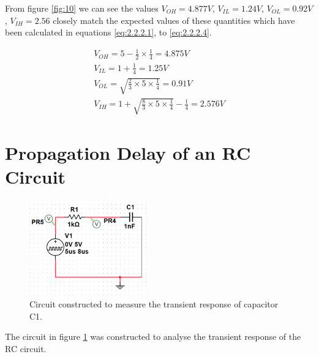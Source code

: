 \documentclass[11pt, a4paper]{article}
\begin{document}
From figure \ref{fig:10} we can see the values $V_{OH} = 4.877V$, $V_{IL} = 1.24V$, $V_{OL} = 0.92V$, 
$V_{IH} = 2.56$ closely match the expected values of these quantities which have been calculated in equations \ref{eq:2.2.2.1}, to \ref{eq:2.2.2.4}.

\begin{gather}
  V_{OH} = 5 - \frac{1}{2} \times \frac{1}{4} = 4.875V\label{eq:2.2.2.1}\\
  V_{IL} = 1 + \frac{1}{4} = 1.25V\label{eq:2.2.2.2}\\
  V_{OL} = \sqrt{\frac{2}{3} \times 5 \times \frac{1}{4}} = 0.91V \label{eq:2.2.2.3}\\
  V_{IH} = 1 + \sqrt{\frac{8}{3} \times 5 \times \frac{1}{4}} - \frac{1}{4} = 2.576V\label{eq:2.2.2.4}
\end{gather}



\newpage
\section{Propagation Delay of an RC Circuit}
\FloatBarrier


\begin{figure}[h]
    \centering
    \includegraphics[width=0.45\textwidth, trim={0 0cm  0 0},clip]{report/img/question_4/circuit4.png}
    \captionsetup{justification=centering}
    \caption{Circuit constructed to measure the transient response of capacitor C1.}
    \label{fig:circuitq4}
\end{figure}


The circuit in figure \ref{fig:circuitq4} was constructed to analyse the transient response of the RC circuit.
\end{document}
